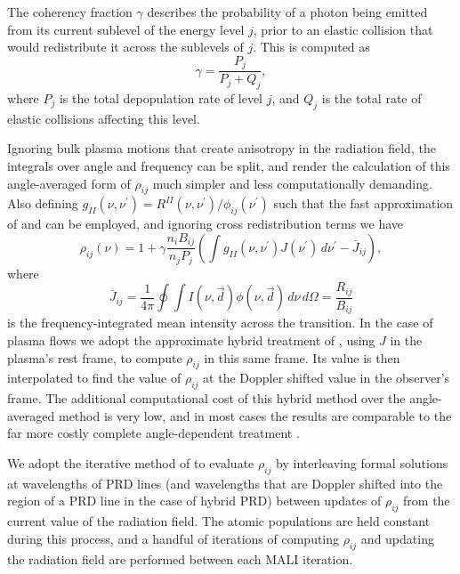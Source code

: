 The coherency fraction $\gamma$ describes the probability of a photon being emitted from its current sublevel of the energy level $j$, prior to an elastic collision that would redistribute it across the sublevels of $j$.
This is computed as
\begin{equation}
    \gamma = \frac{P_j}{P_j + Q_j},
\end{equation}
where $P_j$ is the total depopulation rate of level $j$, and $Q_j$ is the total rate of elastic collisions affecting this level.

Ignoring bulk plasma motions that create anisotropy in the radiation field, the integrals over angle and frequency can be split, and render the calculation of this angle-averaged form of $\rho_{ij}$ much simpler and less computationally demanding.
Also defining $g_{II}(\nu, \nu^\prime) = R^{II}(\nu, \nu^\prime)/\phi_{ij}(\nu^\prime)$ such that the fast approximation of \citet{Gouttebroze1986} and \citet{Uitenbroek1989} can be employed, and ignoring cross redistribution terms we have
\begin{equation}
    \label{Eq:RhoPrdAa}
    \rho_{ij}(\nu) = 1 + \gamma \frac{n_i B_{ij}}{n_j P_j} \left( \int g_{II}(\nu, \nu^\prime) J(\nu^\prime)\,d\nu^\prime - \bar{J}_{ij} \right),
\end{equation}
where
\begin{equation}
\bar{J}_{ij} = \frac{1}{4\pi} \oint \int I(\nu, \vec{d}) \phi(\nu, \vec{d})\,d\nu\,d\Omega = \frac{R_{ij}}{B_{ij}}
\end{equation}
is the frequency-integrated mean intensity across the transition.
In the case of plasma flows we adopt the approximate hybrid treatment of \citet{Leenaarts2012}, using $J$ in the plasma's rest frame, to compute $\rho_{ij}$ in this same frame.
Its value is then interpolated to find the value of $\rho_{ij}$ at the Doppler shifted value in the observer's frame.
The additional computational cost of this hybrid method over the angle-averaged method is very low, and in most cases the results are comparable to the far more costly complete angle-dependent treatment \citep{Leenaarts2012a, Kerr2019}.

We adopt the iterative method of \citet{Uitenbroek2001} to evaluate $\rho_{ij}$ by interleaving formal solutions at wavelengths of PRD lines (and wavelengths that are Doppler shifted into the region of a PRD line in the case of hybrid PRD) between updates of $\rho_{ij}$ from the current value of the radiation field.
The atomic populations are held constant during this process, and a handful of iterations of computing $\rho_{ij}$ and updating the radiation field are performed between each MALI iteration.



